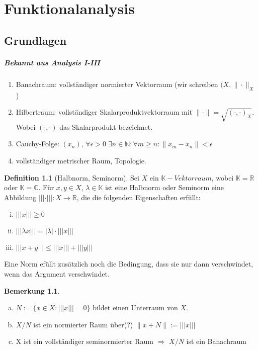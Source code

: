 \documentclass[ngerman]{report}
\theoremstyle{plain}%
\theoremstyle{definition}%
\newtheorem{definition}[thm]{Definition}
\theoremstyle{myStyle}
\newtheorem{bem}[thm]{Bemerkung}
\newcommand{\C}{\mathbb{C}}
\newcommand{\R}{\mathbb{R}}
\newcommand{\N}{\mathbb{N}}
\newcommand{\K}{\mathbb{K}}
\newcommand{\seminorm}[1]{||| #1 |||}
\newcommand{\norm}[1]{\|#1\|}
\begin{document}
\chapter{Funktionalanalysis}
\section{Grundlagen}

\paragraph{Bekannt aus Analysis I-III}

\begin{enumerate}[-]
	\item Banachraum: vollständiger normierter Vektorraum (wir schreiben $(X,\norm{\cdot }_X$) 
	\item Hilbertraum: vollständiger Skalarproduktvektorraum mit $\norm{\cdot } = \sqrt{(\cdot , \cdot )_X}$.  Wobei $(\cdot , \cdot )$ das Skalarprodukt bezeichnet.
	\item Cauchy-Folge: 
					$(x_n),\,  \forall \epsilon > 0\; \exists n \in \N : \forall m \geq n : \norm{x_m-x_n}<\epsilon$
	\item vollständiger metrischer Raum, Topologie.
\end{enumerate}

\begin{definition}[Halbnorm, Seminorm]

	Sei $X$ ein $\K-Vektorraum$, wobei $\K = \R$ oder $\K = \C$. 
	Für $x,y\in X$, $\lambda \in \K$ ist eine Halbnorm oder Seminorm eine Abbildung
	$\seminorm{\cdot}:X \rightarrow \R$, die die folgenden Eigenschaften erfüllt:

		\begin{enumerate}[(i)]
			\item $\seminorm{x}\geq 0$
			\item $\seminorm{\lambda x} = |\lambda|\cdot \seminorm{x}$
			\item $\seminorm{x+y} \leq \seminorm{x} + \seminorm{y}$
		\end{enumerate}
\end{definition}

Eine Norm efüllt zusätzlich noch die Bedingung, dass sie nur dann verschwindet, wenn das Argument verschwindet.

\begin{bem}
	\begin{enumerate}[(a)]
		\item $N:=\{x\in X: \seminorm{x}=0\}$ bildet einen Unterraum von $X$.
		\item $X/N$ ist ein normierter Raum über(?) $\norm{x+N} := \seminorm{x}$
		\item X ist ein vollständiger seminormierter Raum $\Rightarrow$ $X/N$ ist ein Banachraum 
	\end{enumerate}
\end{bem}
\end{document}
